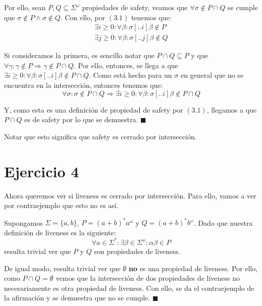 \documentclass{article}
\begin{document}
Por ello, sean $P, Q \subseteq \Sigma^\omega$ propiedades de safety, veamos que $\forall \sigma \notin P \cap Q$ se cumple que $\sigma \notin P \land \sigma \notin Q$.
Con ello, por $(3.1)$ tenemos que:
\begin{equation*}
	\begin{aligned}
		\exists i \geq 0 : \forall \beta : \sigma[..i]\beta \notin P \\
		\exists j \geq 0 : \forall \beta : \sigma[..j]\beta \notin Q
	\end{aligned}
\end{equation*}

Si consideramos la primera, es sencillo notar que $P \cap Q \subseteq P$ y que $\forall \gamma : \gamma \notin P \Rightarrow \gamma \notin P \cap Q$.
Por ello, entonces, se llega a que $\exists i \geq 0 : \forall \beta : \sigma[..i]\beta \notin P \cap Q$.
Como está hecho para un $\sigma$ en general que no se encuentra en la intersección, entonces tenemos que:
\begin{equation*}
	\forall \sigma : \sigma \notin P \cap Q \Rightarrow \exists i \geq 0 : \forall \beta : \sigma[..i]\beta \notin P \cap Q
\end{equation*}

Y, como esta es una definición de propiedad de safety por $(3.1)$, llegamos a que $P \cap Q$ es de safety por lo que se demuestra. $\blacksquare$

Notar que esto significa que safety es cerrado por intersección.

\section*{Ejercicio 4}
Ahora queremos ver si liveness es cerrado por intersección.
Para ello, vamos a ver por contraejemplo que esto no es así.

Supongamos $\Sigma = \{a, b\}$, $P = (a + b)^* a^\omega$ y $Q = (a + b)^* b^\omega$.
Dado que nuestra definición de liveness es la siguiente:
\begin{equation}
	\tag{4.1}
	\forall a \in \Sigma^* : \exists \beta \in \Sigma^\omega : \alpha\beta \in P
\end{equation}
resulta trivial ver que $P$ y $Q$ son propiedades de liveness.

De igual modo, resulta trivial ver que $\emptyset$ \textbf{no} es una propiedad de liveness.
Por ello, como $P \cap Q = \emptyset$ vemos que la intersección de dos propiedades de liveness no necesariamente es otra propiedad de liveness.
Con ello, se da el contraejemplo de la afirmación y se demuestra que no se cumple. $\blacksquare$
\end{document}
